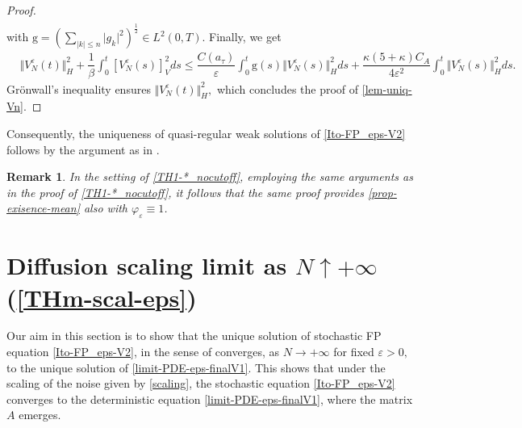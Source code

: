 \documentclass[a4paper,12pt, reqno]{amsart}
\newtheorem{remark}[theorem]{Remark}
\begin{document}
\begin{proof}
\begin{align*}
       \end{align*}
       with $\mathrm{g}=(\sum_{    \vert   k\vert  \leq    n}\vert   g_k\vert^2)^{\frac{1}{2}}\in L^2(0,T)$. Finally, we get
         \begin{align*}
			&\Vert V^\varepsilon_N(t)\Vert^2_H+\dfrac{1}{\beta}\int_0^t[V^\varepsilon_N(s)]^2_V ds\leq \dfrac{C(a_\tau)}{\varepsilon}\int_0^t \mathrm{g}(s)\Vert V^\varepsilon_N(s)\Vert_H^2 ds +\dfrac{\kappa (5+\kappa)C_A}{4\varepsilon^2}\int_0^t\Vert V^\varepsilon_N(s)\Vert_H^2 ds.
			\end{align*}
          Grönwall's inequality ensures $\Vert V^\varepsilon_N(t)\Vert^2_H,$ which concludes the proof of  \autoref{lem-uniq-Vn}.
    \end{proof}
    Consequently, the  uniqueness  of    quasi-regular
		weak solutions  of  \eqref{Ito-FP_eps-V2} follows by the argument as in \cite[Subsection 6.3.1]{Flandoli-Tahraoui}.
\begin{remark}
In the setting of \autoref{TH1-*_nocutoff}, employing the same arguments as in the proof of \autoref{TH1-*_nocutoff}, it follows that the same proof provides \autoref{prop-exisence-mean} also with  $\varphi_\varepsilon\equiv 1$.
\end{remark}

\section{Diffusion scaling limit  as  $N\uparrow +\infty$ (\autoref{THm-scal-eps})}\label{Section-diffusion-limit}
 Our aim in  this    section is  to  show    that    the unique  solution    of   stochastic  FP  equation    \eqref{Ito-FP_eps-V2},    in  the sense   of    converges, as $N\to +\infty$ for fixed $\varepsilon>0,$  to  the unique   solution    of \eqref{limit-PDE-eps-finalV1}. This shows that under the scaling of the noise given by  \eqref{scaling}, the stochastic equation \eqref{Ito-FP_eps-V2} converges to the deterministic equation \eqref{limit-PDE-eps-finalV1}, where the  matrix $A$ emerges.
\end{document}
